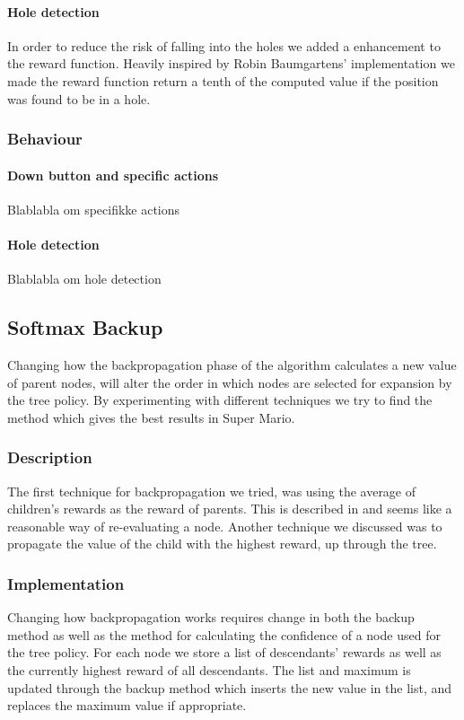 \documentclass[10pt,a4paper]{article}
\begin{document}
\paragraph{Hole detection}
In order to reduce the risk of falling into the holes we added a enhancement to the reward function. Heavily inspired by Robin Baumgartens' implementation we made the reward function return a tenth of the computed value if the position was found to be in a hole.

\subsubsection{Behaviour}

\paragraph{Down button and specific actions}
Blablabla om specifikke actions

\paragraph{Hole detection}
Blablabla om hole detection

\subsection{Softmax Backup} %
Changing how the backpropagation phase of the algorithm calculates a new value of parent nodes, will alter the order in which nodes are selected for expansion by the tree policy. By experimenting with different techniques we try to find the method which gives the best results in Super Mario. %

\subsubsection{Description}
The first technique for backpropagation we tried, was using the average of children's rewards as the reward of parents. This is described in %
and seems like a reasonable way of re-evaluating a node.
Another technique we discussed was to propagate the value of the child with the highest reward, up through the tree. %


\subsubsection{Implementation}
Changing how backpropagation works requires change in both the backup method as well as the method for calculating the confidence of a node used for the tree policy.
For each node we store a list of descendants' rewards as well as the currently highest reward of all descendants. The list and maximum is updated through the backup method which inserts the new value in the list, and replaces the maximum value if appropriate.
\end{document}
